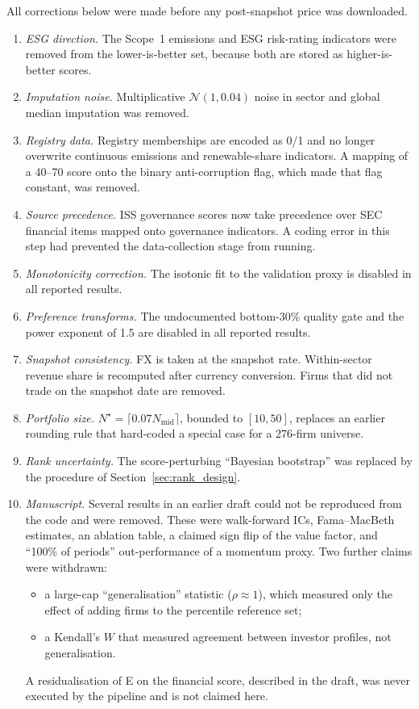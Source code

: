 All corrections below were made before any post-snapshot price was
downloaded.
\begin{enumerate}
\item \emph{ESG direction.} The Scope~1 emissions and ESG risk-rating
  indicators were removed from the lower-is-better set,
  because both are stored as higher-is-better scores.
\item \emph{Imputation noise.} Multiplicative $\mathcal{N}(1,0.04)$ noise in
  sector and global median imputation was removed.
\item \emph{Registry data.} Registry memberships are encoded as 0/1 and no
  longer overwrite continuous emissions and renewable-share indicators. A
  mapping of a 40--70 score onto the binary anti-corruption flag, which made
  that flag constant, was removed.
\item \emph{Source precedence.} ISS governance scores now take precedence
  over SEC financial items mapped onto governance indicators. A coding error in
  this step had prevented the data-collection stage from running.
\item \emph{Monotonicity correction.} The isotonic fit to the validation
  proxy is disabled in all reported results.
\item \emph{Preference transforms.} The undocumented bottom-30\% quality gate
  and the power exponent of 1.5 are disabled in all reported results.
\item \emph{Snapshot consistency.} FX is taken at the snapshot rate.
  Within-sector revenue share is recomputed after currency conversion. Firms that
  did not trade on the snapshot date are removed.
\item \emph{Portfolio size.} $N^\star=\lceil 0.07N_{\mathrm{mid}}\rceil$, bounded
  to $[10,50]$, replaces an earlier rounding rule that hard-coded
  a special case for a 276-firm universe.
\item \emph{Rank uncertainty.} The score-perturbing ``Bayesian bootstrap'' was
  replaced by the procedure of Section~\ref{sec:rank_design}.
\item \emph{Manuscript.} Several results in an earlier draft could not be
  reproduced from the code and were removed. These were walk-forward ICs,
  Fama--MacBeth estimates, an ablation table, a claimed sign flip of the
  value factor, and ``100\% of periods'' out-performance of a momentum proxy.
  Two further claims were withdrawn:
  \begin{itemize}
  \item a large-cap ``generalisation'' statistic ($\rho\approx1$), which
    measured only the effect of adding \NLarge firms to the percentile reference
    set;
  \item a Kendall's $W$ that measured agreement between investor profiles,
    not generalisation.
  \end{itemize}
  A residualisation of E on the financial score, described in the draft, was
  never executed by the pipeline and is not claimed here.
\end{enumerate}
